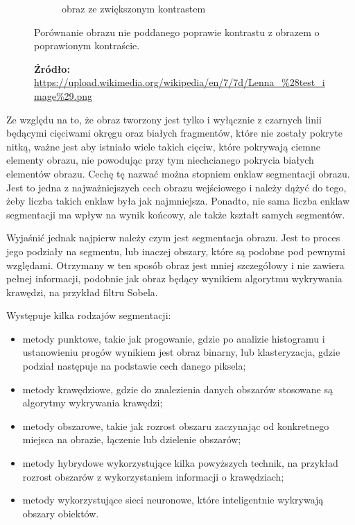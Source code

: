 \begin{figure}[H]
\begin{subfigure}{0.49\textwidth}
                \caption{obraz ze zwiększonym kontrastem}
                \label{theory-contrast-lenna-b}
            \end{subfigure}
            \caption{Porównanie obrazu nie poddanego poprawie kontrastu z obrazem o poprawionym kontraście.}
            \caption*{\footnotesize{\textbf{Źródło:} {\url{https://upload.wikimedia.org/wikipedia/en/7/7d/Lenna_\%28test_image\%29.png}}}}
            \label{theory-contrast-lenna}
        \end{figure}
        
        Ze względu na to, że obraz tworzony jest tylko i wyłącznie z czarnych linii będącymi cięciwami okręgu oraz białych fragmentów, które nie zostały pokryte nitką, ważne jest aby istniało wiele takich cięciw, które pokrywają ciemne elementy obrazu, nie powodując przy tym niechcianego pokrycia białych elementów obrazu. Cechę tę nazwać można stopniem enklaw segmentacji obrazu. Jest to jedna z najważniejszych cech obrazu wejściowego i należy dążyć do tego, żeby liczba takich enklaw była jak najmniejsza. Ponadto, nie sama liczba enklaw segmentacji ma wpływ na wynik końcowy, ale także kształt samych segmentów.
        
        Wyjaśnić jednak najpierw należy czym jest segmentacja obrazu. Jest to proces jego podziały na segmentu, lub inaczej obszary, które są podobne pod pewnymi względami. Otrzymany w ten sposób obraz jest mniej szczegółowy i nie zawiera pełnej informacji, podobnie jak obraz będący wynikiem algorytmu wykrywania krawędzi, na przykład filtru Sobela.
        
        Występuje kilka rodzajów segmentacji:
       \begin{itemize}
            \item metody punktowe, takie jak progowanie, gdzie po analizie histogramu i ustanowieniu progów wynikiem jest obraz binarny, lub klasteryzacja, gdzie podział następuje na podstawie cech danego piksela;
            \item metody krawędziowe, gdzie do znalezienia danych obszarów stosowane są algorytmy wykrywania krawędzi;
            \item metody obszarowe, takie jak rozrost obszaru zaczynając od konkretnego miejsca na obrazie, łączenie lub dzielenie obszarów;
            \item metody hybrydowe wykorzystujące kilka powyższych technik, na przykład rozrost obszarów z wykorzystaniem informacji o krawędziach;
            \item metody wykorzystujące sieci neuronowe, które inteligentnie wykrywają obszary obiektów.
        \end{itemize}

